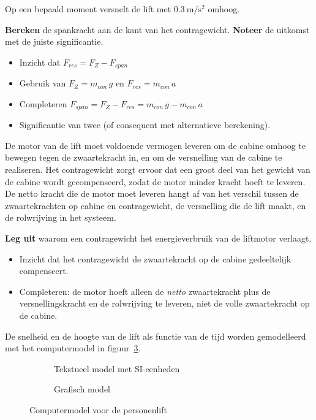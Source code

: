 \documentclass{exam}
\begin{document}
Op een bepaald moment versnelt de lift met $\qty{0,3}{\m\per\second\squared}$
omhoog.

\begin{questions}

\question[4]
\textbf{Bereken} de spankracht aan de kant van het contragewicht.
\textbf{Noteer} de uitkomst met de juiste significantie.

\begin{solution}
  \begin{itemize}
    \item Inzicht dat $F_{res} = F_Z - F_{span}$
    \item Gebruik van $F_Z = m_{con}\,g$ en $F_{res} = m_{con}\,a$
    \item Completeren $F_{span} = F_Z - F_{res} = m_{con}\,g - m_{con}\,a$
    \item Significantie van twee (of consequent met alternatieve berekening).
  \end{itemize}
\end{solution}

De motor van de lift moet voldoende vermogen leveren om de cabine
omhoog te bewegen tegen de zwaartekracht in, en om de versnelling van
de cabine te realiseren.  Het contragewicht zorgt ervoor dat een
groot deel van het gewicht van de cabine wordt gecompenseerd, zodat
de motor minder kracht hoeft te leveren.  De netto kracht die de
motor moet leveren hangt af van het verschil tussen de
zwaartekrachten op cabine en contragewicht, de versnelling die de
lift maakt, en de rolwrijving in het systeem.

\question[2]
\textbf{Leg uit} waarom een contragewicht het energieverbruik van de
liftmotor verlaagt.

\begin{solution}
  \begin{itemize}
    \item Inzicht dat het contragewicht de zwaartekracht op de cabine
      gedeeltelijk compenseert.
    \item Completeren: de motor hoeft alleen de \emph{netto}
      zwaartekracht plus de versnellingskracht en de rolwrijving te
      leveren, niet de volle zwaartekracht op de cabine.
  \end{itemize}
\end{solution}

De snelheid en de hoogte van de lift als functie van de tijd worden
gemodelleerd met het computermodel in figuur~\ref{fig:lift-model}.

\begin{figure}[H]
\centering
\begin{subfigure}[c]{0.50\textwidth}
\centering
\textmodel[tblrenv=tblr]
\caption{Tekstueel model met SI-eenheden}
\label{fig:lift-model-tekstueel}
\end{subfigure}%
\hfill
\begin{subfigure}[c]{0.50\textwidth}
\centering
\graphicmodel
\caption{Grafisch model}
\label{fig:lift-model-grafisch}
\end{subfigure}
\caption{Computermodel voor de personenlift}
\label{fig:lift-model}
\end{figure}

\computemodel

\end{questions}
\end{document}
